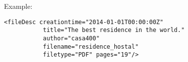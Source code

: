 Example:

\begin{Verbatim}[fontsize=\small]
 <fileDesc creationtime="2014-01-01T00:00:00Z"
           title="The best residence in the world."
           author="casa400"
           filename="residence_hostal"
           filetype="PDF" pages="19"/>
\end{Verbatim}




